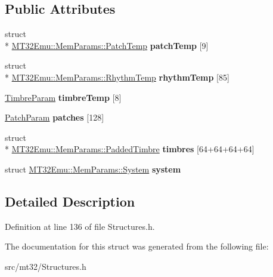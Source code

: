 \subsection*{Public Attributes}
\begin{DoxyCompactItemize}
\item 
\hypertarget{structMT32Emu_1_1MemParams_ada68fa42abd6b49b4865f7907570960f}{struct \\*
\hyperlink{structMT32Emu_1_1MemParams_1_1PatchTemp}{M\-T32\-Emu\-::\-Mem\-Params\-::\-Patch\-Temp} {\bfseries patch\-Temp} \mbox{[}9\mbox{]}}\label{structMT32Emu_1_1MemParams_ada68fa42abd6b49b4865f7907570960f}

\item 
\hypertarget{structMT32Emu_1_1MemParams_ac76b6c15cff64e3a23becb197760844c}{struct \\*
\hyperlink{structMT32Emu_1_1MemParams_1_1RhythmTemp}{M\-T32\-Emu\-::\-Mem\-Params\-::\-Rhythm\-Temp} {\bfseries rhythm\-Temp} \mbox{[}85\mbox{]}}\label{structMT32Emu_1_1MemParams_ac76b6c15cff64e3a23becb197760844c}

\item 
\hypertarget{structMT32Emu_1_1MemParams_a6e3e03d13060862d0605c51ffcdac760}{\hyperlink{structMT32Emu_1_1TimbreParam}{Timbre\-Param} {\bfseries timbre\-Temp} \mbox{[}8\mbox{]}}\label{structMT32Emu_1_1MemParams_a6e3e03d13060862d0605c51ffcdac760}

\item 
\hypertarget{structMT32Emu_1_1MemParams_a654f007dabf27a0b1515449e6753f34b}{\hyperlink{structMT32Emu_1_1PatchParam}{Patch\-Param} {\bfseries patches} \mbox{[}128\mbox{]}}\label{structMT32Emu_1_1MemParams_a654f007dabf27a0b1515449e6753f34b}

\item 
\hypertarget{structMT32Emu_1_1MemParams_a4e1da1751bf9fd7cb610fa05e99f14c4}{struct \\*
\hyperlink{structMT32Emu_1_1MemParams_1_1PaddedTimbre}{M\-T32\-Emu\-::\-Mem\-Params\-::\-Padded\-Timbre} {\bfseries timbres} \mbox{[}64+64+64+64\mbox{]}}\label{structMT32Emu_1_1MemParams_a4e1da1751bf9fd7cb610fa05e99f14c4}

\item 
\hypertarget{structMT32Emu_1_1MemParams_aeb4cd46a57f860cf8cfd355f320b002e}{struct \hyperlink{structMT32Emu_1_1MemParams_1_1System}{M\-T32\-Emu\-::\-Mem\-Params\-::\-System} {\bfseries system}}\label{structMT32Emu_1_1MemParams_aeb4cd46a57f860cf8cfd355f320b002e}

\end{DoxyCompactItemize}


\subsection{Detailed Description}


Definition at line 136 of file Structures.\-h.



The documentation for this struct was generated from the following file\-:\begin{DoxyCompactItemize}
\item 
src/mt32/Structures.\-h\end{DoxyCompactItemize}
